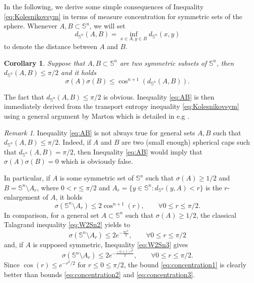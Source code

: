 \documentclass[10pt]{amsart}
\newtheorem{cor}[thm]{Corollary}
\theoremstyle{definition}
\theoremstyle{remark}
\newtheorem{rem}[thm]{Remark}
\newcommand{\Sd}{\mathbb{S}}
\begin{document}
In the following, we derive some simple consequences of Inequality \eqref{eq:Kolesnikovsym} in terms of measure concentration for symmetric sets of the sphere. Whenever $A,B \subset \Sd^n$, we will set
\[
d_{\Sd^n}(A,B) = \inf_{x\in A,y\in B} d_{\Sd^n}(x,y)
\]
to denote the distance between $A$ and $B$.

\begin{cor}
Suppose that $A,B \subset \Sd^n$ are two symmetric subsets of $\Sd^n$, then $d_{\Sd^n}(A,B) \leq \pi/2$ and it holds 
\begin{equation}\label{eq:AB}
\sigma(A)\sigma(B) \leq \cos^{n+1}(d_{\Sd^n}(A,B)).
\end{equation}
\end{cor}
\proof
The fact that $d_{\Sd^n}(A,B) \leq \pi/2$ is obvious. Inequality \eqref{eq:AB} is then immediately derived from the transport entropy inequality \eqref{eq:Kolesnikovsym} using a general argument by Marton which is detailed in e.g \cite[Theorem 10]{Goz07}.
\endproof
\begin{rem}
Inequality \eqref{eq:AB} is not always true for general sets $A,B$ such that $d_{\Sd^n}(A,B) \leq \pi/2$. Indeed, if $A$ and $B$ are two (small enough) spherical caps such that $d_{\Sd^n}(A,B)=\pi/2$, then Inequality \eqref{eq:AB} would imply that $\sigma(A)\sigma(B) = 0$ which is obviously false. 
\end{rem}
In particular, if $A$ is some symmetric set of $\Sd^n$ such that $\sigma(A)\geq 1/2$ and $B= \Sd^n \setminus A_r$, where $0 < r \leq \pi/2$ and $A_r = \{y \in \Sd^n : d_{\Sd^n}(y,A) < r\}$ is the $r$-enlargement of $A$, it holds 
\begin{equation}\label{eq:concentration1}
\sigma(\Sd^n\setminus A_r) \leq  2\cos^{n+1}(r),\qquad \forall 0 \leq r \leq \pi/2.
\end{equation}
In comparison, for a general set $A\subset \Sd^n$ such that $\sigma(A)\geq 1/2$, the classical Talagrand inequality \eqref{eq:W2Sn2} yields to
\begin{equation}\label{eq:concentration2}
\sigma(\Sd^n\setminus A_r) \leq  2e^{-\frac{nr^2}{4}},\qquad \forall 0 \leq r \leq \pi/2
\end{equation}
and, if $A$ is supposed symmetric, Inequality \eqref{eq:W2Sn3} gives
\begin{equation}\label{eq:concentration3}
\sigma(\Sd^n\setminus A_r) \leq  2e^{-\frac{(n+1)r^2}{2}},\qquad \forall 0 \leq r \leq \pi/2.
\end{equation}
Since $\cos(r) \leq e^{-r^2/2}$ for $r\leq 0\leq \pi/2$, the bound \eqref{eq:concentration1} is clearly better than bounds \eqref{eq:concentration2} and \eqref{eq:concentration3}.
\end{document}
